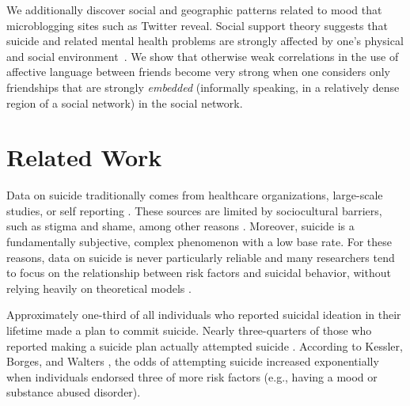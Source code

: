\documentclass[11pt]{article}
\begin{document}
We additionally discover social and geographic patterns related to mood that microblogging sites such as Twitter reveal. Social support theory suggests that suicide and related mental health problems are strongly affected by one's physical and social environment~\cite{wellman1990different}. 
 We show that otherwise weak correlations in the use of affective language between friends become very strong when one considers only friendships that are strongly \emph{embedded} (informally speaking, in a relatively dense region of a social network) in the social network.

\section{Related Work}
Data on suicide traditionally comes from healthcare organizations, large-scale studies, or self reporting \cite{crosby2011self,horowitz2009suicide}. These sources are limited by sociocultural barriers, such as stigma and shame, among other reasons \cite{crosby2011self}. Moreover, suicide is a fundamentally subjective, complex phenomenon with a low base rate. For these reasons, data on suicide is never particularly reliable and many researchers tend to focus on the relationship between risk factors and suicidal behavior, without relying heavily on theoretical models \cite{nock2008suicide}.

Approximately one-third of all individuals who reported suicidal ideation in their lifetime made a plan to commit suicide. Nearly three-quarters of those who reported making a suicide plan actually attempted suicide \cite{kessler1999prevalence}. According to Kessler, Borges, and Walters  \cite{kessler1999prevalence}, the odds of attempting suicide increased exponentially when individuals endorsed three of more risk factors (e.g., having a mood or substance abused disorder). 
\end{document}
